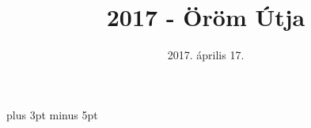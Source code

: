 \documentclass[a5paper,twoside]{article}
\title{2017 - Öröm Útja}
\date{2017. április 17.}
\begin{document}
  \begin{titlepage}
    \setlength{\oddsidemargin}{-1.5cm}
    \vspace*{6cm}
    {\let\newpage\relax\maketitle}
  \end{titlepage}


  \versesep=12pt plus 3pt minus 5pt

  \begin{songs}{}
    
    
    
    
    
  \end{songs}
\end{document}
